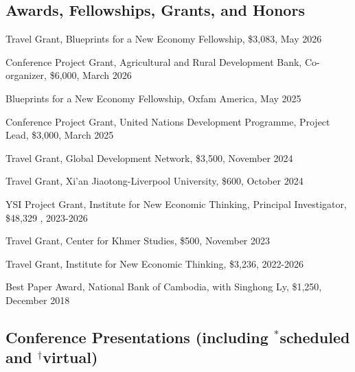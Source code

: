 \documentclass[10pt,a4paper]{article}
\begin{document}




\subsection*{Awards, Fellowships, Grants, and Honors}

\parindent=0pt

		
Travel Grant, Blueprints for a New Economy Fellowship,  \$3,083, May 2026

Conference Project Grant, Agricultural and Rural Development Bank, Co-organizer, \$6,000, March 2026 

Blueprints for a New Economy Fellowship, Oxfam America, May 2025


Conference Project Grant, United Nations Development Programme, Project Lead, \$3,000, March 2025

Travel Grant, Global Development Network, \$3,500, November 2024

Travel Grant, Xi'an Jiaotong-Liverpool University, \$600, October 2024


YSI Project Grant, Institute for New Economic Thinking, Principal Investigator, \$48,329 , 2023-2026


Travel Grant, Center for Khmer Studies, \$500, November 2023


Travel Grant, Institute for New Economic Thinking, \$3,236, 2022-2026

Best Paper Award, National Bank of Cambodia, with Singhong Ly, \$1,250, December 2018 


\subsection*{Conference Presentations (including $^\ast$scheduled and $^\dag$virtual)}
\end{document}
